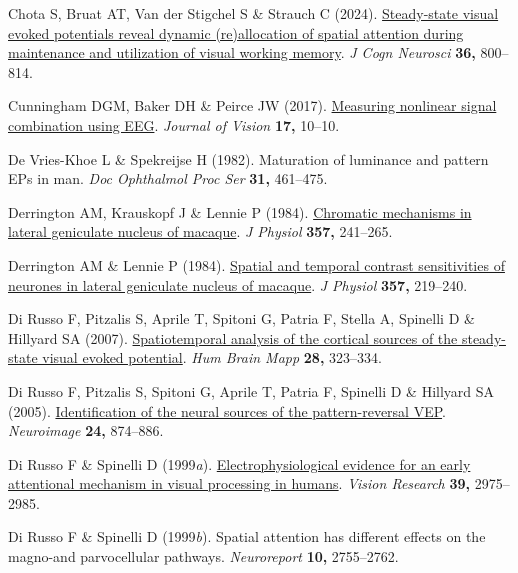 \documentclass[
  letterpaper,
  DIV=11,
  numbers=noendperiod]{scrartcl}
\newlength{\cslhangindent}
\newenvironment{CSLReferences}[2] %
 {\begin{list}{}{%
  \setlength{\itemindent}{0pt}
  \setlength{\leftmargin}{0pt}
  \setlength{\parsep}{0pt}
  \ifodd #1
   \setlength{\leftmargin}{\cslhangindent}
   \setlength{\itemindent}{-1\cslhangindent}
  \fi
  \setlength{\itemsep}{#2\baselineskip}}}
 {\end{list}}
\begin{document}
\begin{CSLReferences}{1}{1}
Chota S, Bruat AT, Van der Stigchel S \& Strauch C (2024).
\href{https://doi.org/10.1162/jocn_a_02107}{Steady-state visual evoked
potentials reveal dynamic (re)allocation of spatial attention during
maintenance and utilization of visual working memory}. \emph{J Cogn
Neurosci} \textbf{36,} 800--814.

Cunningham DGM, Baker DH \& Peirce JW (2017).
\href{https://doi.org/10.1167/17.5.10}{{Measuring nonlinear signal
combination using EEG}}. \emph{Journal of Vision} \textbf{17,} 10--10.

De Vries-Khoe L \& Spekreijse H (1982). Maturation of luminance and
pattern EPs in man. \emph{Doc Ophthalmol Proc Ser} \textbf{31,}
461--475.

Derrington AM, Krauskopf J \& Lennie P (1984).
\href{https://doi.org/10.1113/jphysiol.1984.sp015499}{Chromatic
mechanisms in lateral geniculate nucleus of macaque}. \emph{J Physiol}
\textbf{357,} 241--265.

Derrington AM \& Lennie P (1984).
\href{https://doi.org/10.1113/jphysiol.1984.sp015498}{Spatial and
temporal contrast sensitivities of neurones in lateral geniculate
nucleus of macaque}. \emph{J Physiol} \textbf{357,} 219--240.

Di Russo F, Pitzalis S, Aprile T, Spitoni G, Patria F, Stella A,
Spinelli D \& Hillyard SA (2007).
\href{https://doi.org/10.1002/hbm.20276}{Spatiotemporal analysis of the
cortical sources of the steady-state visual evoked potential}. \emph{Hum
Brain Mapp} \textbf{28,} 323--334.

Di Russo F, Pitzalis S, Spitoni G, Aprile T, Patria F, Spinelli D \&
Hillyard SA (2005).
\href{https://doi.org/10.1016/j.neuroimage.2004.09.029}{Identification
of the neural sources of the pattern-reversal VEP}. \emph{Neuroimage}
\textbf{24,} 874--886.

Di Russo F \& Spinelli D (1999\emph{a}).
\href{https://doi.org/10.1016/S0042-6989(99)00031-0}{Electrophysiological
evidence for an early attentional mechanism in visual processing in
humans}. \emph{Vision Research} \textbf{39,} 2975--2985.

Di Russo F \& Spinelli D (1999\emph{b}). Spatial attention has different
effects on the magno-and parvocellular pathways. \emph{Neuroreport}
\textbf{10,} 2755--2762.


\end{CSLReferences}
\end{document}
